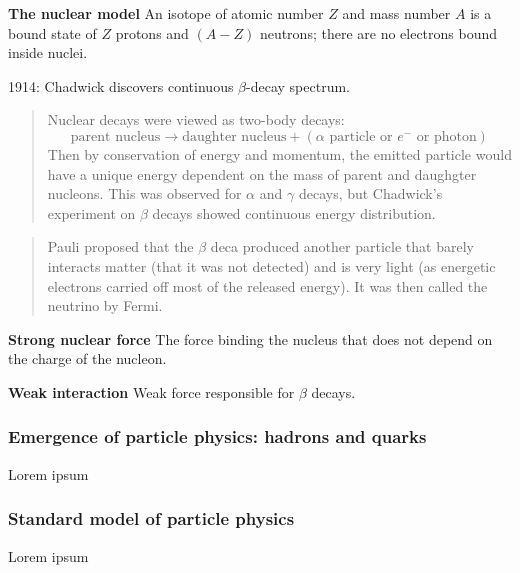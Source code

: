 \documentclass[11pt]{article}
\theoremstyle{definition}
\begin{document}

\begin{shaded}
    \textbf{The nuclear model} \newline
    An isotope of atomic number $Z$ and mass number $A$ is a bound state of $Z$ protons and $(A-Z)$ neutrons; there are no electrons bound inside nuclei.
\end{shaded}

1914: Chadwick discovers continuous $\beta$-decay spectrum.

\begin{quote}
    Nuclear decays were viewed as two-body decays:
    $$ \text{parent nucleus} \rightarrow \text{daughter nucleus} + (\alpha\text{ particle or } e^- \text{ or photon}  ) $$
    Then by conservation of energy and momentum, the emitted particle would have a unique energy dependent on the mass of parent and daughgter nucleons. This was observed for $\alpha$ and $\gamma$ decays, but Chadwick's experiment on $\beta$ decays showed continuous energy distribution.
\end{quote}

\begin{quote}
    Pauli proposed that the $\beta$ deca produced another particle that barely interacts matter (that it was not detected) and is very light (as energetic electrons carried off most of the released energy). It was then called the neutrino by Fermi.
\end{quote}

\begin{shaded}
    \textbf{Strong nuclear force} \newline
    The force binding the nucleus that does not depend on the charge of the nucleon.

    \textbf{Weak interaction} \newline
    Weak force responsible for $\beta$ decays.
\end{shaded}

\subsubsection{Emergence of particle physics: hadrons and quarks}
Lorem ipsum
\subsubsection{Standard model of particle physics}
Lorem ipsum
\end{document}
